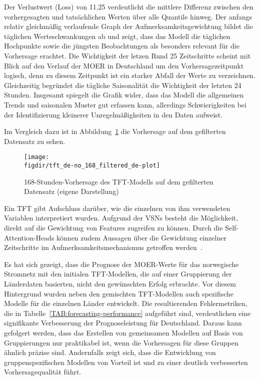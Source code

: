Der Verlustwert (Loss) von 11,25 verdeutlicht die mittlere Differenz zwischen den vorhergesagten und tatsächlichen Werten über alle Quantile hinweg.
Der anfangs relativ gleichmäßig verlaufende Graph der Aufmerksamkeitsgewichtung bildet die täglichen Werteschwankungen ab und zeigt, dass das Modell die täglichen Hochpunkte sowie die jüngsten Beobachtungen als besonders relevant für die Vorhersage erachtet.
Die Wichtigkeit der letzen Rund 25 Zeitschritte scheint mit Blick auf den Verlauf der \ac{MOER} in Deutschland um den Vorhersagezeitpunkt logisch, denn zu diesem Zeitpunkt ist ein starker Abfall der Werte zu verzeichnen.
Gleichzeitig begründet die tägliche Saisonalität die Wichtigkeit der letzten 24 Stunden.
Insgesamt spiegelt die Grafik wider, dass das Modell die allgemeinen Trends und saisonalen Muster gut erfassen kann, allerdings Schwierigkeiten bei der Identifizierung kleinerer Unregelmäßigkeiten in den Daten aufweist.

Im Vergleich dazu ist in Abbildung~\ref{FIG:tft-plot-2} die Vorhersage auf dem gefilterten Datensatz zu sehen.
\begin{figure}
 \caption[TFT 168-Stunden-Vorhersage auf gefiltertem Datensatz]{168-Stunden-Vorhersage des \ac{TFT}-Modells auf dem gefilterten Datensatz (eigene Darstellung)}
 {\texttt{[image: \\figdir/tft\_de-no\_168\_filtered\_de-plot]}}
 \label{FIG:tft-plot-2}
\end{figure}

Ein \ac{TFT} gibt Aufschluss darüber, wie die einzelnen von ihm verwendeten Variablen interpretiert wurden.
Aufgrund der \acp{VSN} besteht die Möglichkeit, direkt auf die Gewichtung von Features zugreifen zu können.
Durch die Self-Attention-Heads können zudem Aussagen über die Gewichtung einzelner Zeitschritte im Aufmerksamkeitsmechanismus getroffen werden~\cite{Joseph.2022}.

Es hat sich gezeigt, dass die Prognose der \ac{MOER}-Werte für das norwegische Stromnetz mit den initialen \ac{TFT}-Modellen, die auf einer Gruppierung der Länderdaten basierten, nicht den gewünschten Erfolg erbrachte.
Vor diesem Hintergrund wurden neben den gemischten \ac{TFT}-Modellen auch spezifische Modelle für die einzelnen Länder entwickelt.
Die resultierenden Fehlermetriken, die in Tabelle~\ref{TAB:forecasting-performance} aufgeführt sind, verdeutlichen eine signifikante Verbesserung der Prognoseleistung für Deutschland.
Daraus kann gefolgert werden, dass das Erstellen von gemeinsamen Modellen auf Basis von Gruppierungen nur praktikabel ist, wenn die Vorhersagen für diese Gruppen ähnlich präzise sind.
Andernfalls zeigt sich, dass die Entwicklung von gruppenspezifischen Modellen von Vorteil ist und zu einer deutlich verbesserten Vorhersagequalität führt.

